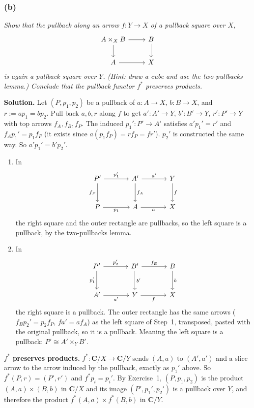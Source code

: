 \subsubsection*{(b)}

\textit{Show that the pullback along an arrow $f: Y \rightarrow X$ of a
pullback square over $X$,}
\[
  \begin{tikzcd}
    A \times_{X} B \ar[r] \ar[d] & B \ar[d] \\
    A \ar[r] & X
  \end{tikzcd}
\]
\textit{is again a pullback square over $Y$. (Hint: draw a cube and use the
two-pullbacks lemma.) Conclude that the pullback functor $f^{*}$ preserves
products.}

\medskip

\textbf{Solution.} Let $(P,p_1,p_2)$ be a pullback of $a : A \to X$, $b : B \to
X$, and $r := a p_1 = b p_2$. Pull back $a, b, r$ along $f$ to get $a' : A' \to
Y$, $b' : B' \to Y$, $r' : P' \to Y$ with top arrows $f_A, f_B, f_P$. The
induced $p_1' : P' \to A'$ satisfies $a' p_1' = r'$ and $f_A p_1' = p_1 f_P$
(it exists since $a(p_1 f_P) = r f_P = f r'$). $p_2'$ is constructed the same
way. So $a' p_1' = b' p_2'$.

\begin{enumerate}
  \item In
    \[
      \begin{tikzcd}[sep=large]
        P' \ar[r, "p_1'"] \ar[d, "f_P"'] & A' \ar[r, "a'"] \ar[d, "f_A"] & Y \ar[d, "f"] \\
        P \ar[r, "p_1"'] & A \ar[r, "a"'] & X
      \end{tikzcd}
    \]
    the right square and the outer rectangle are pullbacks, so the left square
    is a pullback, by the two-pullbacks lemma.
  \item In
    \[
      \begin{tikzcd}[sep=large]
        P' \ar[r, "p_2'"] \ar[d, "p_1'"'] & B' \ar[r, "f_B"] \ar[d, "b'"] & B \ar[d, "b"] \\
        A' \ar[r, "a'"'] & Y \ar[r, "f"'] & X
      \end{tikzcd}
    \]
    the right square is a pullback. The outer rectangle has the same arrows
    ($f_B p_2' = p_2 f_P$, $f a' = a f_A$) as the left square of Step~1,
    transposed, pasted with the original pullback, so it is a pullback. Meaning
    the left square is a pullback: $P' \cong A' \times_Y B'$.
\end{enumerate}

\textbf{$f^*$ preserves products.} $f^* : \mathbf{C}/X \to \mathbf{C}/Y$ sends
$(A,a)$ to $(A',a')$ and a slice arrow to the arrow induced by the pullback,
exactly as $p_1'$ above. So $f^*(P,r) = (P',r')$ and $f^*p_i = p_i'$. By
Exercise~1, $(P,p_1,p_2)$ is the product $(A,a) \times (B,b)$ in
$\mathbf{C}/X$ and its image $(P',p_1',p_2')$ is a pullback over $Y$,
and therefore the product $f^*(A,a) \times f^*(B,b)$ in $\mathbf{C}/Y$.

